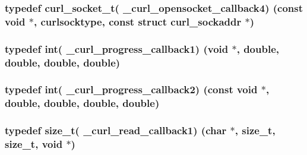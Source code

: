 \subsubsection[{\+\_\+curl\+\_\+opensocket\+\_\+callback4}]{\setlength{\rightskip}{0pt plus 5cm}typedef {\bf curl\+\_\+socket\+\_\+t}( \+\_\+curl\+\_\+opensocket\+\_\+callback4) (const void $\ast$, {\bf curlsocktype}, const struct {\bf curl\+\_\+sockaddr} $\ast$)}\label{typecheck-gcc_8h_ac996e9ffa7bb261a4589ce066ac69bb9}
\hypertarget{typecheck-gcc_8h_a4a19f089bb72a78916e0c8f6d3eabb43}{}
\subsubsection[{\+\_\+curl\+\_\+progress\+\_\+callback1}]{\setlength{\rightskip}{0pt plus 5cm}typedef int( \+\_\+curl\+\_\+progress\+\_\+callback1) (void $\ast$, double, double, double, double)}\label{typecheck-gcc_8h_a4a19f089bb72a78916e0c8f6d3eabb43}
\hypertarget{typecheck-gcc_8h_a07f7e31041e7c89dd37e0abaa886eda1}{}
\subsubsection[{\+\_\+curl\+\_\+progress\+\_\+callback2}]{\setlength{\rightskip}{0pt plus 5cm}typedef int( \+\_\+curl\+\_\+progress\+\_\+callback2) (const void $\ast$, double, double, double, double)}\label{typecheck-gcc_8h_a07f7e31041e7c89dd37e0abaa886eda1}
\hypertarget{typecheck-gcc_8h_aa598cc71fb379db1bc23ff76e8b875c1}{}
\subsubsection[{\+\_\+curl\+\_\+read\+\_\+callback1}]{\setlength{\rightskip}{0pt plus 5cm}typedef size\+\_\+t( \+\_\+curl\+\_\+read\+\_\+callback1) (char $\ast$, size\+\_\+t, size\+\_\+t, void $\ast$)}\label{typecheck-gcc_8h_aa598cc71fb379db1bc23ff76e8b875c1}
\hypertarget{typecheck-gcc_8h_abc8917aae6499414b1ed0d570d8a9b72}{}
